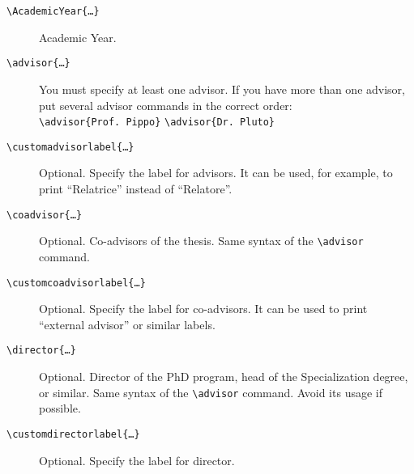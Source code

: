 \documentclass[a5paper,11pt]{article}
\newcommand{\bs}{\textbackslash}
\begin{document}
\begin{description}
\item[\texttt{\bs AcademicYear\{\dots\}}] Academic Year.

\item[\texttt{\bs advisor\{\dots\}}] You must specify at least one advisor.
If you have more than one advisor, put several advisor commands in the correct order:\\
\texttt{\bs advisor\{Prof.~Pippo\}} \texttt{\bs advisor\{Dr.~Pluto\}}

\item[\texttt{\bs customadvisorlabel\{\dots\}}] Optional. Specify the label for advisors. It can be used, for example, to print ``Relatrice'' instead of ``Relatore''.

\item[\texttt{\bs coadvisor\{\dots\}}] Optional. Co-advisors of the thesis. 
Same syntax of the \texttt{\bs advisor} command.

\item[\texttt{\bs customcoadvisorlabel\{\dots\}}] Optional. Specify the label for co-advisors. It can be used to print ``external advisor'' or similar labels.

\item[\texttt{\bs director\{\dots\}}] Optional. Director of the PhD program, head of the Specialization degree, or similar. Same syntax of the \texttt{\bs advisor} command. Avoid its usage if possible.

\item[\texttt{\bs customdirectorlabel\{\dots\}}] Optional. Specify the label for director.

\end{description}
\end{document}
